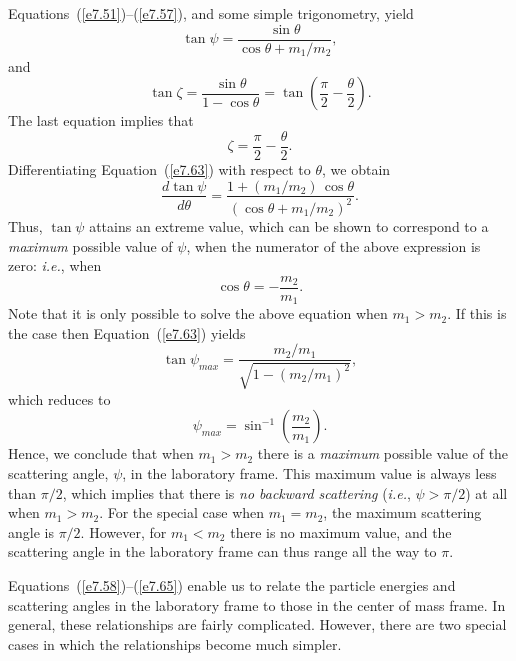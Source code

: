 Equations~(\ref{e7.51})--(\ref{e7.57}), and some simple trigonometry, yield
\begin{equation}\label{e7.63}
\tan\psi = \frac{\sin\theta}{\cos\theta+m_1/m_2},
\end{equation}
and
\begin{equation}
\tan\zeta = \frac{\sin\theta}{1-\cos\theta} = \tan\left(\frac{\pi}{2}-\frac{\theta}{2}\right).
\end{equation}
The last equation implies that
\begin{equation}\label{e7.65}
\zeta = \frac{\pi}{2}- \frac{\theta}{2}.
\end{equation}
Differentiating Equation~(\ref{e7.63}) with respect to $\theta$, we obtain
\begin{equation}
\frac{d\tan\psi}{d\theta} = \frac{1+(m_1/m_2)\,\cos\theta}{(\cos\theta+m_1/m_2)^2}.
\end{equation}
Thus, $\tan\psi$ attains an extreme value, which can be shown to correspond to a {\em maximum}\/
possible value of $\psi$, when the numerator of the above expression is zero:
{\em i.e.}, when
\begin{equation}
\cos\theta = -\frac{m_2}{m_1}.
\end{equation}
Note that it is only possible to solve the above equation when $m_1>m_2$.
If this is the case then Equation~(\ref{e7.63}) yields
\begin{equation}
\tan\psi_{max} = \frac{m_2/m_1}{\sqrt{1-(m_2/m_1)^2}},
\end{equation}
which reduces to
\begin{equation}
\psi_{max} = \sin^{-1}\left(\frac{m_2}{m_1}\right).
\end{equation}
Hence, we conclude that when $m_1>m_2$ there is a {\em maximum}\/ possible
value of the scattering angle, $\psi$, in the laboratory frame. This maximum
value is always less than $\pi/2$, which implies that there is
{\em no backward scattering}\/ ({\em i.e.}, $\psi>\pi/2$) at all when $m_1>m_2$. For the special case when
$m_1=m_2$, the maximum scattering angle is $\pi/2$. However, for
$m_1<m_2$ there is no maximum value, and the scattering angle in the laboratory frame can thus
range all the way to $\pi$. 

Equations~(\ref{e7.58})--(\ref{e7.65}) enable us to relate the
particle energies and scattering angles in the laboratory frame to those
in the center of mass frame. In general, these relationships are fairly complicated. 
However, there are two special cases in which the relationships become
much simpler. 


